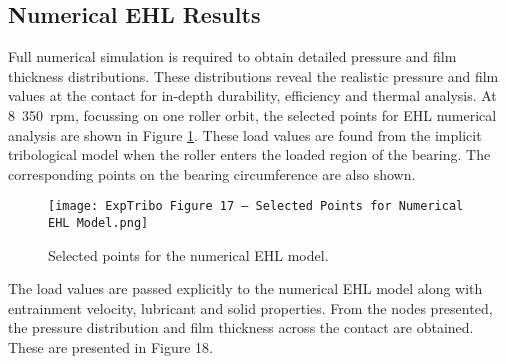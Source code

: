 \subsection{Numerical EHL Results} \label{Numerical vs analytical experimental}

Full numerical simulation is required to obtain detailed pressure and film thickness distributions. These distributions reveal the realistic pressure and film values at the contact for in-depth durability, efficiency and thermal analysis. At 8~350~rpm, focussing on one roller orbit, the selected points for EHL numerical analysis are shown in Figure \ref{Selected points for the numerical EHL model}. These load values are found from the implicit tribological model when the roller enters the loaded region of the bearing. The corresponding points on the bearing circumference are also shown. 

\begin{figure}
	\centering
	\texttt{[image: ExpTribo Figure 17 – Selected Points for Numerical EHL Model.png]}
	\caption{Selected points for the numerical EHL model.}
	\label{Selected points for the numerical EHL model}
\end{figure} 

The load values are passed explicitly to the numerical EHL model along with entrainment velocity, lubricant and solid properties. From the nodes presented, the pressure distribution and film thickness across the contact are obtained. These are presented in Figure 18.

